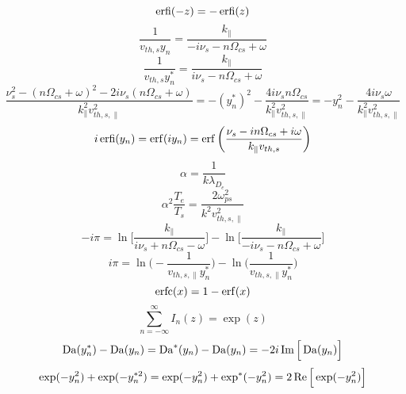 \begin{equation}
	\operatorname{erfi}(-z) = -\operatorname{erfi}(z) 
	\label{eq:a_erfi_odd}
\end{equation}
\begin{equation}
	\frac{1}{v_{th,s}y_n} = \frac{k_\parallel}{-i\nu_s-n\Omega_{cs}+\omega}
	\label{eq:a_vthyn}
\end{equation}
\begin{equation}
	\frac{1}{v_{th,s}y_n^*} = \frac{k_\parallel}{i\nu_s-n\Omega_{cs}+\omega}
	\label{eq:a_vthynstar}
\end{equation}
\begin{equation}
	\frac{\nu_s^2-(n\Omega_{cs}+\omega)^2-2 i \nu_s (n\Omega_{cs}+ \omega)}{k_\parallel^2 v_{th,s,\parallel}^2} = 
	-(y_n^*)^2 - \frac{4 i \nu_s n \Omega_{cs}}{k_\parallel^2 v_{th,s,\parallel}^2}
	= - y_n^2 - \frac{4 i \nu_s \omega}{k_\parallel^2 v_{th,s,\parallel}^2}  
	\label{eq:a_ynstar_plus}
\end{equation}
\begin{equation}
	i \erfi(y_n) = \erf (i y_n) = \erf \bigg( \frac{\nu_s - i n\Omega_{cs} + i \omega}{k_\parallel v_{th,s}}  \bigg)  %
	\label{eq:a_erfiyn}
\end{equation}
\begin{equation}
	\alpha = \frac{1}{k \lambda_{D_e}}
	\label{eq:a_alpha}
\end{equation}
\begin{equation}
	\alpha^2 \frac{T_e}{T_s} = \frac{2 \omega_{ps}^2}{k^2 v_{th,s,\parallel}^2}
	\label{eq:a_alpha2}
\end{equation}
\begin{equation}
	-i\pi = \ln \Big[ \frac{k_\parallel}{i\nu_s + n\Omega_{cs} - \omega} \Big]
	- \ln \Big[ \frac{k_\parallel}{-i\nu_s - n\Omega_{cs} + \omega} \Big] 
	\label{eq:a_lnipi}
\end{equation}
\begin{equation}
	i\pi = \ln \Big( -\frac{1}{v_{th,s,\parallel}y_n^*}\Big) - \ln \Big(\frac{1}{v_{th,s,\parallel}y_n^*}\Big)
	\label{eq:a_lnipistar}
\end{equation}
\begin{equation}
	\operatorname{erfc}(x) = 1 - \operatorname{erf}(x)
	\label{eq:a_erfc}
\end{equation}
\begin{equation}
	\sum_{n=-\infty}^\infty I_n(z) = \exp(z)
	\label{eq:a_sumIn}
\end{equation}
\begin{equation}
	\operatorname{Da}(y_n^*) - \operatorname{Da}(y_n) = \operatorname{Da}^*(y_n) - \operatorname{Da}(y_n) = -2 i \operatorname{Im}\Big[ \operatorname{Da}(y_n) \Big]
	\label{eq:a_Dastar}
\end{equation}
\begin{equation}
	\exp(-y_n^2) + \exp(-y_n^{*2}) = \exp(-y_n^2) + \exp^*(-y_n^2) = 2 \operatorname{Re} \Big[ \exp(-y_n^2) \Big]
	\label{eq:a_expstar}
\end{equation}

